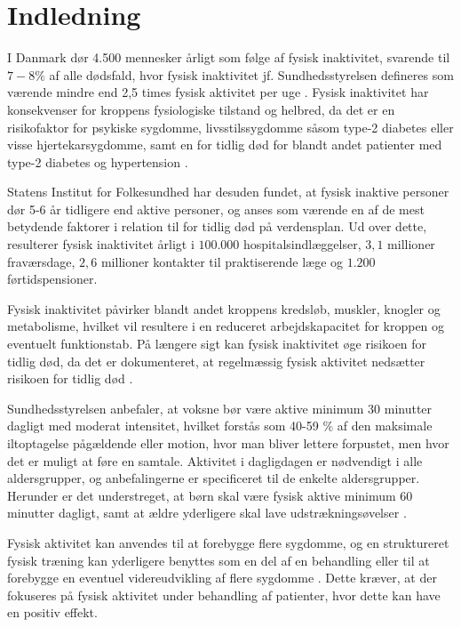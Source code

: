 \chapter{Indledning} \label{sec:indledning}
I Danmark dør 4.500 mennesker årligt som følge af fysisk inaktivitet, svarende til $7-8\%$ af alle dødsfald, hvor fysisk inaktivitet jf. Sundhedsstyrelsen defineres som værende mindre end 2,5 times fysisk aktivitet per uge \citep{aagaard2014}. Fysisk inaktivitet har konsekvenser for kroppens fysiologiske tilstand og helbred, da det er en risikofaktor for psykiske sygdomme, livsstilssygdomme såsom type-2 diabetes eller visse hjertekarsygdomme, samt en for tidlig død for blandt andet patienter med type-2 diabetes og hypertension \citep{motionsraad2007}. 

Statens Institut for Folkesundhed har desuden fundet, at fysisk inaktive personer dør 5-6 år tidligere end aktive personer, og anses som værende en af de mest betydende faktorer i relation til for tidlig død på verdensplan. Ud over dette, resulterer fysisk inaktivitet årligt i $100.000$ hospitalsindlæggelser, $3,1$ millioner fraværsdage, $2,6$ millioner kontakter til praktiserende læge og $1.200$ førtidspensioner\citep{christensen2012}.

Fysisk inaktivitet påvirker blandt andet kroppens kredsløb, muskler, knogler og metabolisme, hvilket vil resultere i en reduceret arbejdskapacitet for kroppen og eventuelt funktionstab. På længere sigt kan fysisk inaktivitet øge risikoen for tidlig død, da det er dokumenteret, at regelmæssig fysisk aktivitet nedsætter risikoen for tidlig død \citep{motionsraad2007}.

Sundhedsstyrelsen anbefaler, at voksne bør være aktive minimum 30 minutter dagligt med moderat intensitet, hvilket forstås som 40-59 $\%$ af den maksimale iltoptagelse pågældende eller motion, hvor man bliver lettere forpustet, men hvor det er muligt at føre en samtale.
Aktivitet i dagligdagen er nødvendigt i alle aldersgrupper, og anbefalingerne er specificeret til de enkelte aldersgrupper. Herunder er det understreget, at børn skal være fysisk aktive minimum 60 minutter dagligt, samt at ældre yderligere skal lave udstrækningsøvelser \citep{pedersen2011}.

Fysisk aktivitet kan anvendes til at forebygge flere sygdomme, og en struktureret fysisk træning kan yderligere benyttes som en del af en behandling eller til at forebygge en eventuel videreudvikling af flere sygdomme \citep{motionsraad2007}. Dette kræver, at der fokuseres på fysisk aktivitet under behandling af patienter, hvor dette kan have en positiv effekt.

